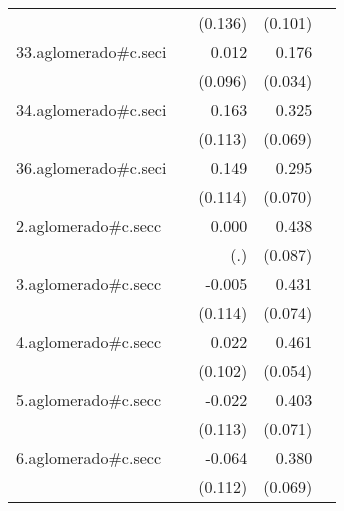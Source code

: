 {\begin{longtable}{l*{4}{D{.}{.}{-1}}}
            &                     &     (0.136)         &     (0.101)         &                     \\
\addlinespace
33.aglomerado#c.seci&                     &       0.012         &       0.176\sym{***}&                     \\
            &                     &     (0.096)         &     (0.034)         &                     \\
\addlinespace
34.aglomerado#c.seci&                     &       0.163         &       0.325\sym{***}&                     \\
            &                     &     (0.113)         &     (0.069)         &                     \\
\addlinespace
36.aglomerado#c.seci&                     &       0.149         &       0.295\sym{***}&                     \\
            &                     &     (0.114)         &     (0.070)         &                     \\
\addlinespace
2.aglomerado#c.secc&                     &       0.000         &       0.438\sym{***}&                     \\
            &                     &         (.)         &     (0.087)         &                     \\
\addlinespace
3.aglomerado#c.secc&                     &      -0.005         &       0.431\sym{***}&                     \\
            &                     &     (0.114)         &     (0.074)         &                     \\
\addlinespace
4.aglomerado#c.secc&                     &       0.022         &       0.461\sym{***}&                     \\
            &                     &     (0.102)         &     (0.054)         &                     \\
\addlinespace
5.aglomerado#c.secc&                     &      -0.022         &       0.403\sym{***}&                     \\
            &                     &     (0.113)         &     (0.071)         &                     \\
\addlinespace
6.aglomerado#c.secc&                     &      -0.064         &       0.380\sym{***}&                     \\
            &                     &     (0.112)         &     (0.069)         &                     \\

\end{longtable}}
